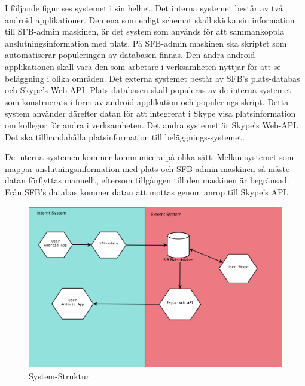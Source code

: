 \documentclass[swedish, a4paper,12pt]{article}
\begin{document}
I följande figur  %
ses systemet i sin helhet. Det interna systemet består av två android applikationer. Den ena som enligt schemat skall skicka sin information till SFB-admin maskinen, är det system som används för att sammankoppla anslutningsinformation med plats. På SFB-admin maskinen ska skriptet som automatiserar populeringen av databasen finnas. Den andra android applikationen skall vara den som arbetare i verksamheten nyttjar för att se beläggning i olika områden.
Det externa systemet består av SFB's plats-databas och Skype's Web-API. %
Plats-databasen skall populeras av de interna systemet som konstruerats i form av android applikation och populerings-skript. Detta system använder därefter datan för att integrerat i Skype visa platsinformation om kollegor för andra i verksamheten. Det andra systemet är Skype's Web-API. Det ska tillhandahålla platsinformation till beläggnings-systemet.

De interna systemen kommer kommunicera på olika sätt. Mellan systemet som mappar anslutningsinformation med plats och SFB-admin maskinen så måste datan förflyttas manuellt, eftersom tillgången till den maskinen är begränsad. Från SFB's databas kommer datan att mottas genom anrop till Skype's API. %

\begin{figure}[h]
	\includegraphics[width=15cm]{media/systemStruktur.png}
	\caption{System-Struktur}
	\label{}
\end{figure}
\end{document}
